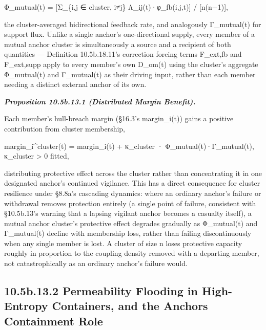 \documentclass[
]{article}
\begin{document}
Φ\_mutual(t) = {[}Σ\_\{i,j ∈ cluster, i≠j\} Λ\_ij(t)·φ\_fb(i,j,t){]} /
{[}n(n−1){]},

the cluster-averaged bidirectional feedback rate, and analogously
Γ\_mutual(t) for support flux. Unlike a single anchor's one-directional
supply, every member of a mutual anchor cluster is simultaneously a
source and a recipient of both quantities --- Definition 10.5b.18.11's
correction forcing terms F\_ext,fb and F\_ext,supp apply to every
member's own D\_om(t) using the cluster's aggregate Φ\_mutual(t) and
Γ\_mutual(t) as their driving input, rather than each member needing a
distinct external anchor of its own.

\emph{\textbf{Proposition 10.5b.13.1 (Distributed Margin Benefit).}}

Each member's hull-breach margin (§16.3's margin\_i(t)) gains a positive
contribution from cluster membership,

margin\_i\^{}cluster(t) = margin\_i(t) + κ\_cluster ·
Φ\_mutual(t)·Γ\_mutual(t), κ\_cluster \textgreater{} 0 fitted,

distributing protective effect across the cluster rather than
concentrating it in one designated anchor's continued vigilance. This
has a direct consequence for cluster resilience under §8.8a's cascading
dynamics: where an ordinary anchor's failure or withdrawal removes
protection entirely (a single point of failure, consistent with
§10.5b.13's warning that a lapsing vigilant anchor becomes a casualty
itself), a mutual anchor cluster's protective effect degrades gradually
as Φ\_mutual(t) and Γ\_mutual(t) decline with membership loss, rather
than failing discontinuously when any single member is lost. A cluster
of size n loses protective capacity roughly in proportion to the
coupling density removed with a departing member, not catastrophically
as an ordinary anchor's failure would.

\hypertarget{b.13.2-permeability-flooding-in-high-entropy-containers-and-the-anchors-containment-role}{%
\subsection{10.5b.13.2 Permeability Flooding in High-Entropy Containers,
and the Anchors Containment
Role}\label{b.13.2-permeability-flooding-in-high-entropy-containers-and-the-anchors-containment-role}}
\end{document}
